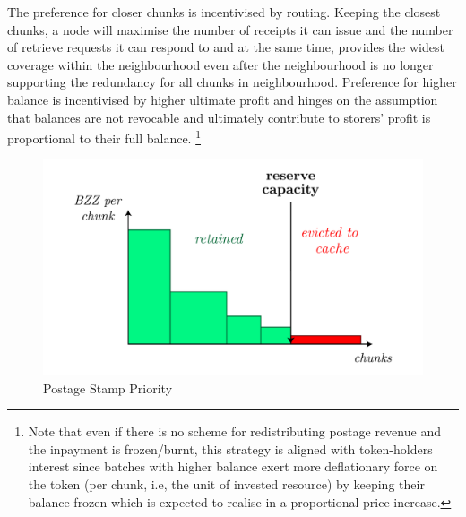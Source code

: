 The preference for closer chunks is incentivised by routing. Keeping the closest chunks, a node will maximise the number of receipts it can issue and the number of retrieve requests it can respond to and at the same time, provides the widest coverage within the neighbourhood even after the neighbourhood is no longer supporting the redundancy for all chunks in neighbourhood. Preference for higher balance is incentivised by higher ultimate profit and hinges on the assumption that balances are not revocable and  ultimately contribute to storers' profit is proportional to their full balance.%
%
\footnote{Note that even if there is no scheme for redistributing postage revenue and the inpayment is frozen/burnt, this strategy is aligned with token-holders interest since batches with higher balance exert more deflationary force on the token (per chunk, i.e, the unit of invested resource) by keeping their balance frozen which is expected to realise in a proportional price increase.}


\begin{figure}[!ht]
  \centering
    \includegraphics[width=\textwidth]{fig/reserve-capacity-2.pdf}
  \caption[Postage Stamp Priority]{Postage Stamp Priority}
\label{fig:reserve-capacity}
\end{figure}    







